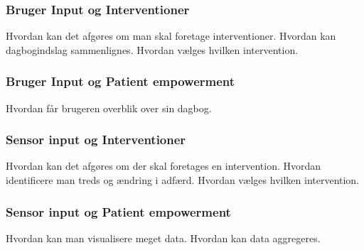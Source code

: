 \subsubsection*{Bruger Input og Interventioner}
Hvordan kan det afgøres om man skal foretage interventioner.
Hvordan kan dagbogindslag sammenlignes.
Hvordan vælges hvilken intervention.
\subsubsection*{Bruger Input og Patient empowerment}
Hvordan får brugeren overblik over sin dagbog.
\subsubsection*{Sensor input og Interventioner} 
Hvordan kan det afgøres om der skal foretages en intervention.
Hvordan identificere man treds og ændring i adfærd.
Hvordan vælges hvilken intervention.
\subsubsection*{Sensor input og Patient empowerment}
Hvordan kan man visualisere meget data.
Hvordan kan data aggregeres.
